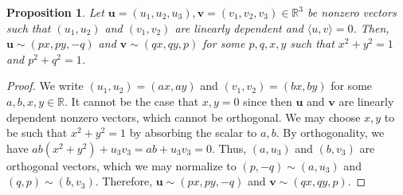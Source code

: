 \documentclass[11pt]{article}
\newtheorem{proposition}[theorem]{Proposition}
\begin{document}
\begin{proposition}\label{prop:normalize-lin-dep-orthogonal-vectors}
  Let
  $\mathbf{u} = (u_1, u_2, u_3), \mathbf{v} = (v_1, v_2, v_3) \in \mathbb{R}^3$ be nonzero vectors such that $(u_1, u_2)$ and $(v_1, v_2)$ are linearly dependent and $\langle u, v \rangle = 0$.
  Then, $\mathbf{u} \sim (px, py, -q)$ and $\mathbf{v} \sim (qx, qy, p)$ for some $p, q, x, y$ such that $x^2 + y^2 = 1$ and $p^2 + q^2 = 1$.
\end{proposition}
\begin{proof}
  We write $(u_1, u_2) = (ax, ay)$ and $(v_1, v_2) = (bx, by)$ for some $a, b, x, y \in \mathbb{R}$.
  It cannot be the case that $x, y = 0$ since then $\mathbf{u}$ and $\mathbf{v}$ are linearly dependent nonzero vectors, which cannot be orthogonal.
  We may choose $x, y$ to be such that $x^2 + y^2 = 1$ by absorbing the scalar to $a, b$.
  By orthogonality, we have $ab(x^2 + y^2) + u_3v_3 = ab + u_3 v_3 = 0$.
  Thus, $(a, u_3)$ and $(b, v_3)$ are orthogonal vectors, which we may normalize to $(p, -q) \sim (a, u_3)$ and $(q, p) \sim (b, v_3)$.
  Therefore, $\mathbf{u} \sim (px, py, -q)$ and $\mathbf{v} \sim (qx, qy, p)$.
\end{proof}
\end{document}
